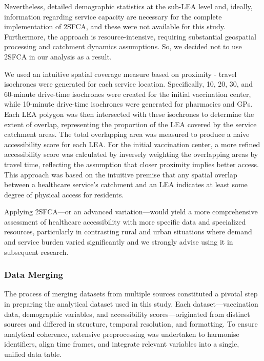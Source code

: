 \documentclass{article}
\begin{document}
Nevertheless, detailed demographic statistics at the sub-LEA level and,
ideally, information regarding service capacity are necessary for the
complete implementation of 2SFCA, and these were not available for this
study. Furthermore, the approach is resource-intensive, requiring
substantial geospatial processing and catchment dynamics assumptions.
So, we decided not to use 2SFCA in our analysis as a result.

We used an intuitive spatial coverage measure based on proximity -
travel isochrones were generated for each service location.
Specifically, 10, 20, 30, and 60-minute drive-time isochrones were
created for the initial vaccination center, while 10-minute drive-time
isochrones were generated for pharmacies and GPs. Each LEA polygon was
then intersected with these isochrones to determine the extent of
overlap, representing the proportion of the LEA covered by the service
catchment areas. The total overlapping area was measured to produce a
naive accessibility score for each LEA. For the initial vaccination
center, a more refined accessibility score was calculated by inversely
weighting the overlapping areas by travel time, reflecting the
assumption that closer proximity implies better access. This approach
was based on the intuitive premise that any spatial overlap between a
healthcare service's catchment and an LEA indicates at least some degree
of physical access for residents.

Applying 2SFCA---or an advanced variation---would yield a more
comprehensive assessment of healthcare accessibility with more specific
data and specialized resources, particularly in contrasting rural and
urban situations where demand and service burden varied significantly
and we strongly advise using it in subsequent research.

\subsubsection{Data Merging}\label{data-merging}

The process of merging datasets from multiple sources constituted a
pivotal step in preparing the analytical dataset used in this study.
Each dataset---vaccination data, demographic variables, and
accessibility scores---originated from distinct sources and differed in
structure, temporal resolution, and formatting. To ensure analytical
coherence, extensive preprocessing was undertaken to harmonise
identifiers, align time frames, and integrate relevant variables into a
single, unified data table.
\end{document}
